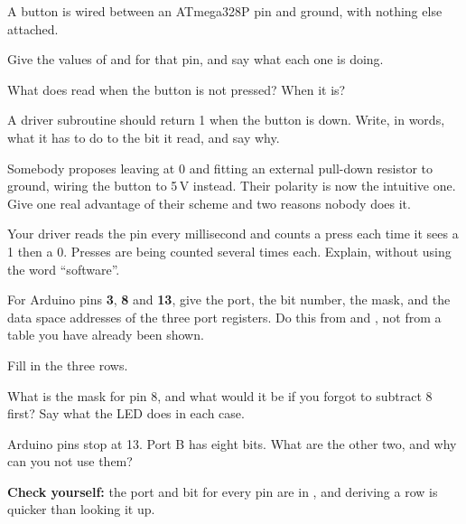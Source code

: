 \label{c2:ex:button}
A button is wired between an ATmega328P pin and ground, with nothing else attached.
\begin{parts}
  \item Give the values of  and  for that pin, and say what each one is
    doing.
  \item What does  read when the button is not pressed? When it is?
  \item A driver subroutine  should return 1 when the button is down. Write, in
    words, what it has to do to the bit it read, and say why.
  \item Somebody proposes leaving  at 0 and fitting an external pull-down resistor to
    ground, wiring the button to 5\,V instead. Their polarity is now the intuitive one. Give one
    real advantage of their scheme and two reasons nobody does it.
  \item Your driver reads the pin every millisecond and counts a press each time it sees a 1 then
    a 0. Presses are being counted several times each. Explain, without using the word
    ``software''.
\end{parts}

\label{c2:ex:translate}
For Arduino pins \textbf{3}, \textbf{8} and \textbf{13}, give the port, the bit number, the mask,
and the data space addresses of the three port registers. Do this from  and
, not from a table you have already been shown.
\begin{parts}
  \item Fill in the three rows.
  \item What is the mask for pin 8, and what would it be if you forgot to subtract 8 first? Say
    what the LED does in each case.
  \item Arduino pins stop at 13. Port B has eight bits. What are the other two, and why can you not
    use them?
\end{parts}

\noindent\textbf{Check yourself:} the port and bit for every pin are in , and
deriving a row is quicker than looking it up.

